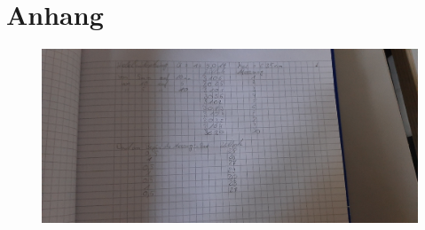 \section{Anhang}
\label{sec:Anhang}
\begin{figure}[H]
    \centering
    \includegraphics[width = .95\textwidth]{messungen/Messdaten-v401.pdf}
\end{figure}